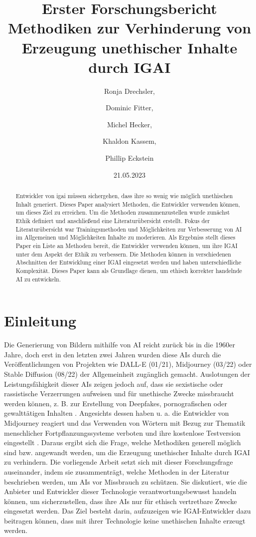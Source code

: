 \documentclass[12pt]{report}
\title{Erster Forschungsbericht \\[1ex] \large Methodiken zur Verhinderung von  Erzeugung unethischer Inhalte durch IGAI}
\date{21.05.2023}
\author{Ronja Drechsler, \and Dominic Fitter, \and Michel Hecker, \and Khaldon Kassem, \and Phillip Eckstein}
\begin{document}
\maketitle
\tableofcontents
\newpage
\printnoidxglossary
\newpage

\begin{abstract}
	Entwickler von \Gls{igai} müssen sichergehen, dass ihre  so wenig wie möglich unethischen Inhalt generiert.
	Dieses Paper analysiert Methoden, die Entwickler verwenden können, um dieses Ziel zu erreichen. 
	Um die Methoden zusammenzustellen wurde zunächst Ethik definiert und anschließend eine Literaturübersicht erstellt. 
	Fokus der Literaturübersicht war Trainingsmethoden und Möglichkeiten zur Verbesserung von AI im Allgemeinen und Möglichkeiten Inhalte zu moderieren. 
	Als Ergebniss stellt dieses Paper ein Liste an Methoden bereit, die Entwickler verwenden können, um ihre IGAI unter dem Aspekt der Ethik zu verbessern. 
	Die Methoden können in verschiedenen Abschnitten der Entwicklung einer IGAI eingesetzt werden und haben unterschiedliche Komplexität. 
	Dieses Paper kann als Grundlage dienen, um ethisch korrekter handelnde AI zu entwickeln.
\end{abstract}


\chapter{Einleitung}
Die Generierung von Bildern mithilfe von AI reicht zurück bis in die 1960er Jahre\cite{Garcia}, doch erst in den letzten zwei Jahren wurden diese AIs durch die Veröffentlichungen von Projekten wie DALL-E (01/21), Midjourney (03/22) oder Stable Diffusion (08/22) der Allgemeinheit zugänglich gemacht. Auslotungen der Leistungsfähigkeit dieser AIs zeigen jedoch auf, dass sie sexistische oder rassistische Verzerrungen aufweisen \cite{Schmidt} und für unethische Zwecke missbraucht werden können, z. B. zur Erstellung von Deepfakes, pornografischen oder gewalttätigen Inhalten \cite{Hadero}.
Angesichts dessen haben u. a. die Entwickler von Midjourney reagiert und das Verwenden von Wörtern mit Bezug zur Thematik menschlicher Fortpflanzungssysteme verboten \cite{Heikkilae} und ihre kostenlose Testversion eingestellt \cite{NelsonMidjourney}. Daraus ergibt sich die Frage, welche Methodiken generell möglich sind bzw. angewandt werden, um die Erzeugung unethischer Inhalte durch IGAI zu verhindern.
Die vorliegende Arbeit setzt sich mit dieser Forschungsfrage auseinander, indem sie zusammenträgt, welche Methoden in der Literatur beschrieben werden, um AIs vor Missbrauch zu schützen. Sie diskutiert, wie die Anbieter und Entwickler dieser Technologie verantwortungsbewusst handeln können, um sicherzustellen, dass ihre AIs nur für ethisch vertretbare Zwecke eingesetzt werden. Das Ziel besteht darin, aufzuzeigen wie IGAI-Entwickler dazu beitragen können, dass mit ihrer Technologie keine unethischen Inhalte erzeugt werden.
\end{document}
